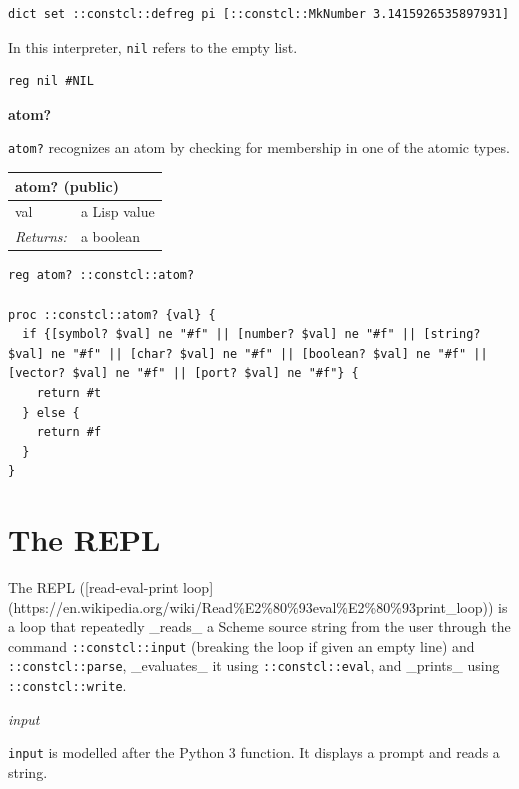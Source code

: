 \documentclass[twoside,9pt]{report}
\begin{document}
\noindent\makebox[\linewidth]{\rule{\linewidth}{0.4pt}}
\begin{lstlisting}
dict set ::constcl::defreg pi [::constcl::MkNumber 3.1415926535897931]
\end{lstlisting}
\noindent\makebox[\linewidth]{\rule{\linewidth}{0.4pt}}

In this interpreter, \texttt{nil} refers to the empty list.

\noindent\makebox[\linewidth]{\rule{\linewidth}{0.4pt}}
\begin{lstlisting}
reg nil #NIL
\end{lstlisting}
\noindent\makebox[\linewidth]{\rule{\linewidth}{0.4pt}}

\textbf{atom?}


\texttt{atom?} recognizes an atom by checking for membership in one of the atomic types.

\begin{tabular}{ |l l| }
\hline
\multicolumn{2}{|l|}{atom? (public)} \\
\hline
val & a Lisp value \\
\textit{Returns:} & a boolean \\
\hline
\end{tabular}

\noindent\makebox[\linewidth]{\rule{\linewidth}{0.4pt}}
\begin{lstlisting}
reg atom? ::constcl::atom?
 
proc ::constcl::atom? {val} {
  if {[symbol? $val] ne "#f" || [number? $val] ne "#f" || [string? $val] ne "#f" || [char? $val] ne "#f" || [boolean? $val] ne "#f" || [vector? $val] ne "#f" || [port? $val] ne "#f"} {
    return #t
  } else {
    return #f
  }
}
\end{lstlisting}
\noindent\makebox[\linewidth]{\rule{\linewidth}{0.4pt}}
\chapter{The REPL}
\label{the-repl}

The REPL ([read-eval-print loop](https://en.wikipedia.org/wiki/Read\%E2\%80\%93eval\%E2\%80\%93print\_loop)) is a loop that repeatedly \_reads\_ a Scheme source string from the user through the command \texttt{::constcl::input} (breaking the loop if given an empty line) and \texttt{::constcl::parse}, \_evaluates\_ it using \texttt{::constcl::eval}, and \_prints\_ using \texttt{::constcl::write}.


\emph{input}


\texttt{input} is modelled after the Python 3 function. It displays a prompt and reads a string.
\end{document}
